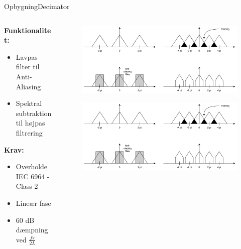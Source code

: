 \begin{frame}{Opbygning}{Decimator}	
	\begin{columns}
		\begin{column}{0.4\textwidth}
			\textbf{Funktionalitet:}
			\begin{itemize}
				\item Lavpas filter til Anti-Aliasing
				\item Spektral subtraktion til højpas filtrering 
			\end{itemize}
			
			\textbf{Krav:}
			\begin{itemize}
				\item Overholde IEC 6964 - Class 2
				\item Lineær fase
				\item 60 dB dæmpning ved $\frac{fs}{2L}$
			\end{itemize}
		\end{column}
		\begin{column}{0.3\textwidth}
			\begin{figure}
				\centering
				\includegraphics[width=\textwidth]{aliasing1}
			\end{figure}
			\begin{figure}
				\centering
				\includegraphics[width=\textwidth]{aliasing3}

\end{figure}
\end{column}
\end{columns}
\end{frame}
